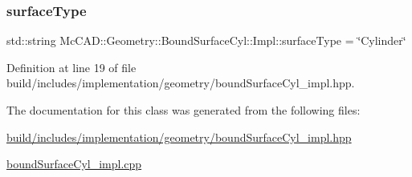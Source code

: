 \subsubsection{\texorpdfstring{surface\+Type}{surfaceType}}
{\footnotesize\ttfamily std\+::string Mc\+C\+A\+D\+::\+Geometry\+::\+Bound\+Surface\+Cyl\+::\+Impl\+::surface\+Type = \char`\"{}Cylinder\char`\"{}}



Definition at line 19 of file build/includes/implementation/geometry/bound\+Surface\+Cyl\+\_\+impl.\+hpp.



The documentation for this class was generated from the following files\+:\begin{DoxyCompactItemize}
\item 
\hyperlink{build_2includes_2implementation_2geometry_2boundSurfaceCyl__impl_8hpp}{build/includes/implementation/geometry/bound\+Surface\+Cyl\+\_\+impl.\+hpp}\item 
\hyperlink{boundSurfaceCyl__impl_8cpp}{bound\+Surface\+Cyl\+\_\+impl.\+cpp}\end{DoxyCompactItemize}
